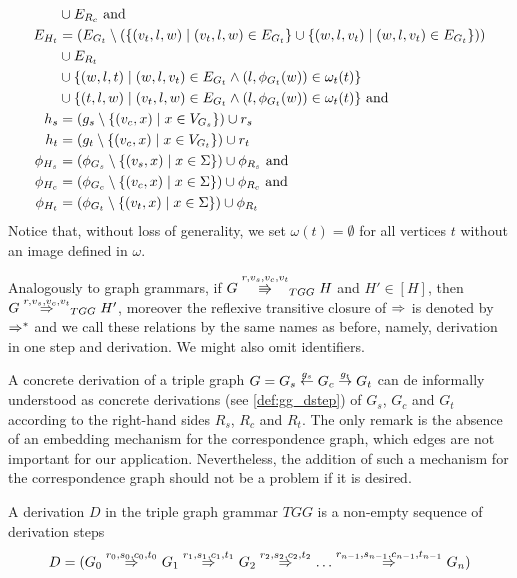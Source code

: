 \documentclass[]{report}
\begin{document}
\begin{definition}
\begin{align*}
		& \cup E_{R_c} \text{ and} \\
		E_{H_t} & = (E_{G_t} \setminus (\{(v_t,l,w) \; | \; (v_t,l,w) \in E_{G_t}\} \cup \{(w,l,v_t) \; | \; (w,l,v_t) \in E_{G_t}\})) \\
		& \cup E_{R_t} \\
		& \cup \{(w,l,t) \; | \; (w,l,v_t) \in E_{G_t} \land (l,\phi_{G_t}(w)) \in \omega_{t}(t)\} \\
		& \cup \{(t,l,w) \; | \; (v_t,l,w) \in E_{G_t} \land (l,\phi_{G_t}(w)) \in \omega_{t}(t)\} \text{ and} \\
		h_s		& = (g_s \setminus \{(v_c,x) \; | \; x \in V_{G_s}\}) \cup r_s  \\
		h_t		& = (g_t \setminus \{(v_c,x) \; | \; x \in V_{G_t}\}) \cup r_t  \\
		\phi_{H_s} & = (\phi_{G_s} \setminus \{(v_s,x) \; | \; x \in \Sigma\}) \cup \phi_{R_s} \text{ and}\\
		\phi_{H_c} & = (\phi_{G_c} \setminus \{(v_c,x) \; | \; x \in \Sigma\}) \cup \phi_{R_c} \text{ and}\\
		\phi_{H_t} & = (\phi_{G_t} \setminus \{(v_t,x) \; | \; x \in \Sigma\}) \cup \phi_{R_t}\\
	\end{align*}
	Notice that, without loss of generality, we set $\omega(t) = \emptyset$ for all vertices $t$ without an image defined in $\omega$.
	
	Analogously to graph grammars, if $G \cderiv{r}{v_s,v_c,v_t}{TGG} H$ and $H' \in [H]$, then $G \tderiv{r}{v_s,v_c,v_t}{TGG} H'$, moreover the reflexive transitive closure of $\tderiv{}{}{}$ is denoted by $\Rightarrow^*_{}$ and we call these relations by the same names as before, namely, derivation in one step and derivation. We might also omit identifiers.
\end{definition}

A concrete derivation of a triple graph $G = G_s \overset{g_s}{\leftarrow} G_c \overset{g_t}{\rightarrow} G_t$ can de informally understood as concrete derivations (see \ref{def:gg_dstep}) of $G_s$, $G_c$ and $G_t$ according to the right-hand sides $R_s$, $R_c$ and $R_t$. The only remark is the absence of an embedding mechanism for the correspondence graph, which edges are not important for our application. Nevertheless, the addition of such a mechanism for the correspondence graph should not be a problem if it is desired.

\begin{definition}
	A derivation $D$ in the triple graph grammar $TGG$ is a non-empty sequence of derivation steps
	\[ 
	D = (G_0 \tderiv{r_0}{s_0,c_0,t_0}{} G_1 \tderiv{r_1}{s_1,c_1,t_1}{} G_2 \tderiv{r_2}{s_2,c_2,t_2}{} \dots \tderiv{r_{n-1}}{s_{n-1},c_{n-1},t_{n-1}}{} G_n)
	\]
\end{definition}
\end{document}
